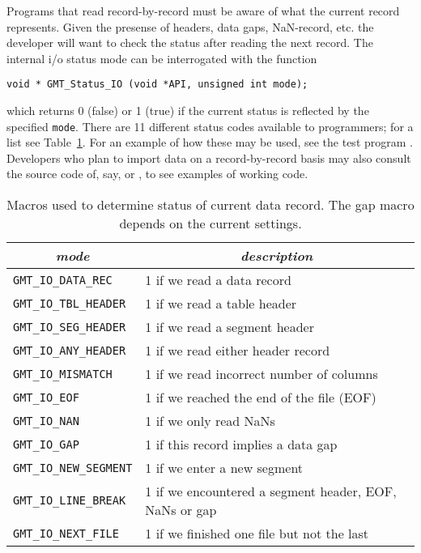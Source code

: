 \documentclass[11pt]{report}
\begin{document}
Programs that read record-by-record must be aware of what the current record represents.
Given the presense of headers, data gaps, NaN-record, etc. the developer will want to
check the status after reading the next record.  The internal i/o status mode can be
interrogated with the function

\begin{verbatim}
void * GMT_Status_IO (void *API, unsigned int mode);
\end{verbatim}

which returns 0 (false) or 1 (true) if the current status is reflected by the specified \texttt{mode}.
There are 11 different status codes available to programmers; for a list see Table~\ref{tbl:iostatus}.
For an example of how these may be used, see the test program .
Developers who plan to import data on a record-by-record basis may also consult the source
code of, say,  or , to see examples of working code.

\begin{table}[h]
\small
\centering
\begin{tabular}{|l|l|} \hline
\multicolumn{1}{|c|}{\emph{mode}} & \multicolumn{1}{c|}{\emph{description}} \\ \hline
\texttt{GMT\_IO\_DATA\_REC}	&       1 if we read a data record \\ \hline
\texttt{GMT\_IO\_TBL\_HEADER}	&       1 if we read a table header \\ \hline
\texttt{GMT\_IO\_SEG\_HEADER}	&       1 if we read a segment header \\ \hline
\texttt{GMT\_IO\_ANY\_HEADER}	&       1 if we read either header record \\ \hline
\texttt{GMT\_IO\_MISMATCH}	&       1 if we read incorrect number of columns \\ \hline
\texttt{GMT\_IO\_EOF}		&       1 if we reached the end of the file (EOF) \\ \hline
\texttt{GMT\_IO\_NAN}		&       1 if we only read NaNs \\ \hline
\texttt{GMT\_IO\_GAP}		&       1 if this record implies a data gap \\ \hline
\texttt{GMT\_IO\_NEW\_SEGMENT}	&       1 if we enter a new segment \\ \hline
\texttt{GMT\_IO\_LINE\_BREAK}	&       1 if we encountered a segment header, EOF, NaNs or gap \\ \hline
\texttt{GMT\_IO\_NEXT\_FILE}	&       1 if we finished one file but not the last \\ \hline
\end{tabular}
\caption{Macros used to determine status of current data record.  The gap macro depends on the current  settings.}
\label{tbl:iostatus}
\end{table}
\end{document}
